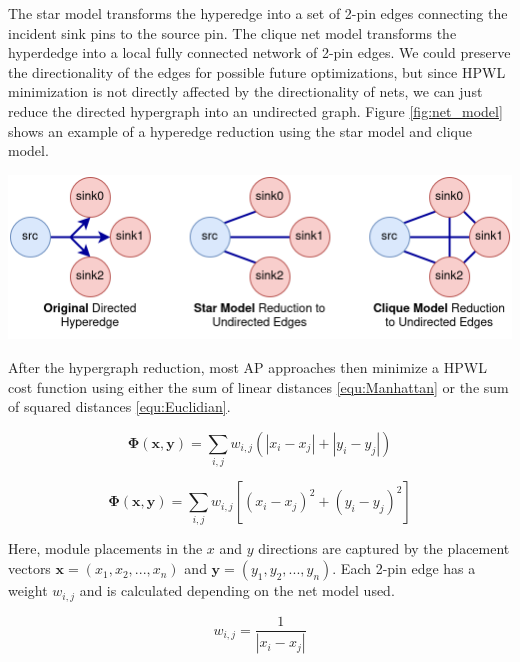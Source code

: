 The star model transforms the hyperedge into a set of 2-pin edges connecting the incident sink pins to the source pin.
The clique net model transforms the hyperdedge into a local fully connected network of 2-pin edges.
We could preserve the directionality of the edges for possible future optimizations, but since HPWL minimization is not directly affected by the directionality of nets, we can just reduce the directed hypergraph into an undirected graph.
Figure \ref{fig:net_model} shows an example of a hyperedge reduction using the star model and clique model.

\vspace{1.0cm}
{
    \centering
    \includegraphics[width=\columnwidth]{figures/future_work/net_model.png}
    \label{fig:net_model}
}


After the hypergraph reduction, most AP approaches then minimize a HPWL cost function using either the sum of linear distances \ref{equ:Manhattan} or the sum of squared distances \ref{equ:Euclidian}.

\begin{equation}
    \boldsymbol{\Phi} (\boldsymbol{x}, \boldsymbol{y}) = \sum_{i,j} w_{i,j} \left( |x_i - x_j| + |y_i - y_j| \right)
    \label{equ:Manhattan}
\end{equation}

\begin{equation}
    \boldsymbol{\Phi} (\boldsymbol{x}, \boldsymbol{y}) = \sum_{i,j} w_{i,j} \left[ (x_i - x_j)^2 + (y_i - y_j)^2 \right]
    \label{equ:Euclidian}
\end{equation}

Here, module placements in the \(x\) and \(y\) directions are captured by the placement vectors \( \boldsymbol{x} = (x_1, x_2, ..., x_n) \) and \( \boldsymbol{y} = (y_1, y_2, ..., y_n) \).
Each 2-pin edge has a weight \( w_{i,j} \) and is calculated depending on the net model used.

\begin{equation}
    w_{i,j} = \frac{1}{|x_i - x_j|}
    \label{equ:weight}
\end{equation}


